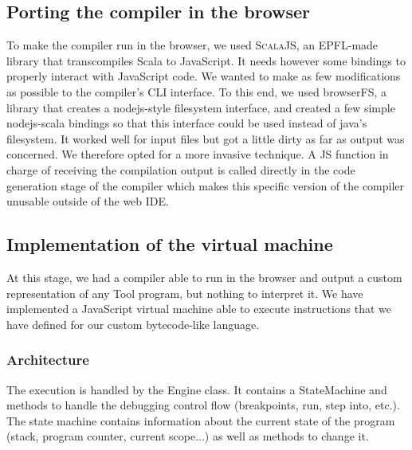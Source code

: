 


\subsection{Porting the compiler in the browser}

To make the compiler run in the browser, we used \textsc{ScalaJS}, an EPFL-made library that transcompiles Scala to JavaScript.
It needs however some bindings to properly interact with JavaScript code. We wanted to make as few modifications as possible to the compiler's CLI interface. To this end, we used browserFS, a library that creates a nodejs-style filesystem interface, and created a few simple nodejs-scala bindings so that this interface could be used instead of java's filesystem. It worked well for input files but got a little dirty as far as output was concerned. We therefore opted for a more invasive technique. A JS function in charge of receiving the compilation output is called directly in the code generation stage of the compiler which makes this specific version of the compiler unusable outside of the web IDE.


\subsection{Implementation of the virtual machine}

At this stage, we had a compiler able to run in the browser and output a custom representation of any Tool program, but nothing to interpret it.
We have implemented a JavaScript virtual machine able to execute instructions that we have defined for our custom bytecode-like language.

\subsubsection{Architecture}

The execution is handled by the Engine class. It contains a StateMachine and methods to handle the debugging control flow (breakpoints, run, step into, etc.).
The state machine contains information about the current state of the program (stack, program counter, current scope...) as well as methods to change it.\\

